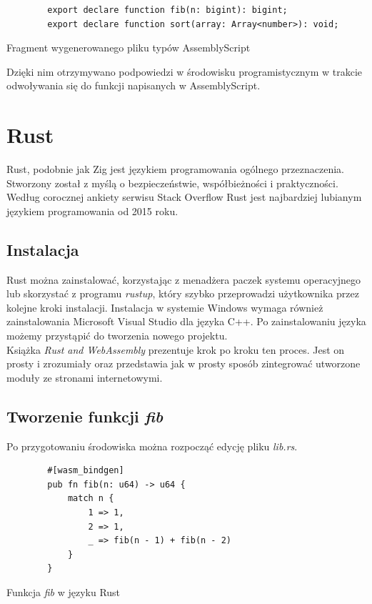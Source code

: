 \documentclass[language=polish,type=master]{aghmodern}
\begin{document}
\begin{listing}[H]
    \begin{verbatim}
        export declare function fib(n: bigint): bigint;
        export declare function sort(array: Array<number>): void;
    \end{verbatim}
    \caption{Fragment wygenerowanego pliku typów AssemblyScript}
\end{listing}

Dzięki nim otrzymywano podpowiedzi w środowisku programistycznym w trakcie odwoływania się do funkcji napisanych w AssemblyScript.

\section{Rust}
Rust, podobnie jak Zig jest językiem programowania ogólnego przeznaczenia.
Stworzony został z myślą o bezpieczeństwie, współbieżności i praktyczności.
Według corocznej ankiety serwisu Stack Overflow\footnotemark{} Rust jest najbardziej lubianym językiem programowania od 2015 roku.

\subsection{Instalacja}
Rust można zainstalować, korzystając z menadżera paczek systemu operacyjnego lub skorzystać z programu \emph{rustup}\footnotemark{}, który szybko przeprowadzi użytkownika przez kolejne kroki instalacji.
Instalacja w systemie Windows wymaga również zainstalowania Microsoft Visual Studio dla języka C++.
Po zainstalowaniu języka możemy przystąpić do tworzenia nowego projektu. \\
Książka \emph{Rust and WebAssembly}\footnotemark{} prezentuje krok po kroku ten proces.
Jest on prosty i zrozumiały oraz przedstawia jak w prosty sposób zintegrować utworzone moduły ze stronami internetowymi.

\subsection{Tworzenie funkcji \emph{fib}}
Po przygotowaniu środowiska można rozpocząć edycję pliku \emph{lib.rs}.

\begin{listing}[H]
    \begin{verbatim}
        #[wasm_bindgen]
        pub fn fib(n: u64) -> u64 {
            match n {
                1 => 1,
                2 => 1,
                _ => fib(n - 1) + fib(n - 2)
            }
        }
    \end{verbatim}
    \caption{Funkcja \emph{fib} w języku Rust}
\end{listing}
\end{document}
